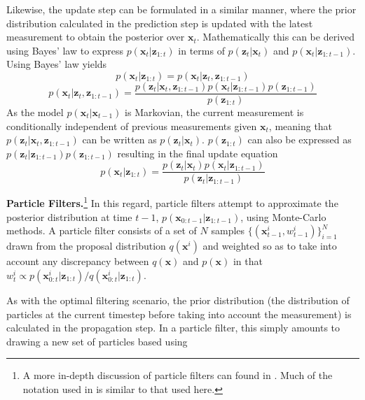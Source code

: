 \documentclass[letterpaper, 10 pt, conference]{ieeeconf}
\renewcommand{\vec}[1]{\boldsymbol{#1}}
\begin{document}
Likewise, the update step can be formulated in a similar manner, where the prior distribution calculated in the prediction step is updated with the latest measurement to obtain the posterior over $\vec{x}_t$. Mathematically this can be derived using Bayes' law to express $p(\vec{x}_t|\vec{z}_{1:t})$ in terms of $p(\vec{z}_t|\vec{x}_t)$ and $p(\vec{x}_t|\vec{z}_{1:t-1})$. Using Bayes' law yields
\begin{equation*}
	p(\vec{x}_t|\vec{z}_{1:t}) = p(\vec{x}_t|\vec{z}_t,\vec{z}_{1:t-1})
\end{equation*}
\begin{equation*}
p(\vec{x}_t|\vec{z}_t,\vec{z}_{1:t-1}) = \frac{p(\vec{z}_t|\vec{x}_t, \vec{z}_{1:t-1})p(\vec{x}_t|\vec{z}_{1:t-1})p(\vec{z}_{1:t-1})}{p(\vec{z}_{1:t})}
\end{equation*}
As the model $p(\vec{x}_t|\vec{x}_{t-1})$ is Markovian, the current measurement is conditionally independent of previous measurements given $\vec{x}_t$, meaning that $p(\vec{z}_{t}|\vec{x}_t, \vec{z}_{1:t-1})$ can be written as $p(\vec{z}_t|\vec{x}_t)$. $p(\vec{z}_{1:t})$ can also be expressed as $p(\vec{z}_t|\vec{z}_{1:t-1})p(\vec{z}_{1:t-1})$ resulting in the final update equation \citep{ParticleNotes}
\begin{equation} \label{eq:update}
	p(\vec{x}_t|\vec{z}_{1:t}) = \frac{p(\vec{z}_{t}|\vec{x}_t)p(\vec{x}_{t}|\vec{z}_{1:t-1})}{p(\vec{z}_t|\vec{z}_{1:t-1})}
\end{equation}


\textbf{Particle Filters.}\footnote{A more in-depth discussion of particle filters can found in \citep{ParticleNotes}. Much of the notation used in \citep{ParticleNotes} is similar to that used here.} In this regard, particle filters attempt to approximate the posterior distribution at time $t-1$, $p(\vec{x}_{0:t-1}|\vec{z}_{1:t-1})$, using Monte-Carlo methods. A particle filter consists of a set of $N$ samples $\{ (\vec{x}^i_{t-1}, w^i_{t-1}) \}_{i=1}^N$ drawn from the proposal distribution $q(\vec{x}^i)$ and weighted so as to take into account any discrepancy between $q(\vec{x})$ and $p(\vec{x})$ in that $w^i_t \propto p(\vec{x}^i_{0:t}|\vec{z}_{1:t})/q(\vec{x}^i_{0:t}|\vec{z}_{1:t})$.

As with the optimal filtering scenario, the prior distribution (the distribution of particles at the current timestep before taking into account the measurement) is calculated in the propagation step. In a particle filter, this simply amounts to drawing a new set of particles based using
\end{document}
